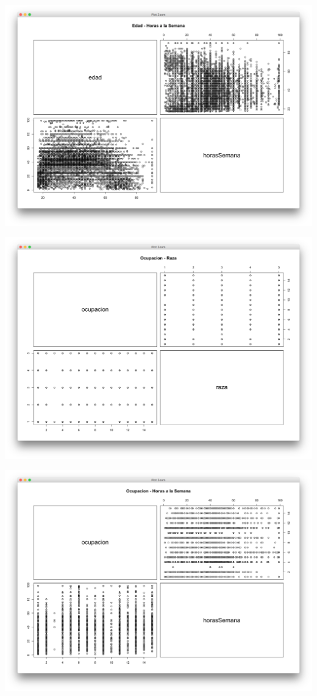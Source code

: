 \documentclass{article}
\begin{document}
  \begin{center}
    \hbox{\hspace{-5.5em}\includegraphics[scale=0.45]{graficas/edadHoras}}
  \end{center}
  \begin{center}
    \hbox{\hspace{-5.5em}\includegraphics[scale=0.45]{graficas/ocupacion-raza}}
  \end{center}
  \begin{center}
    \hbox{\hspace{-5.5em}\includegraphics[scale=0.45]{graficas/ocupacionHoras}}
  \end{center}
\end{document}
